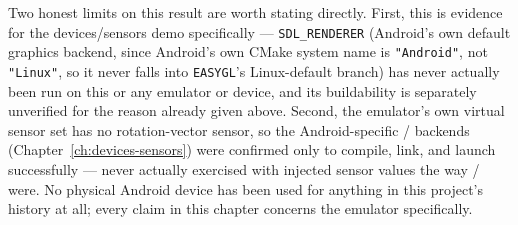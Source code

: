 Two honest limits on this result are worth stating directly. First, this is evidence for the
devices/sensors demo specifically --- \texttt{SDL\_RENDERER} (Android's own default graphics
backend, since Android's own CMake system name is \texttt{"Android"}, not \texttt{"Linux"},
so it never falls into \texttt{EASYGL}'s Linux-default branch) has never actually been run on
this or any emulator or device, and its buildability is separately unverified for the reason
already given above. Second, the emulator's own virtual sensor set has no rotation-vector
sensor, so the Android-specific  /  backends
(Chapter~\ref{ch:devices-sensors}) were confirmed only to compile, link, and launch
successfully --- never actually exercised with injected sensor values the way
 /  were. No physical Android device has been used
for anything in this project's history at all; every claim in this chapter concerns the
emulator specifically.
